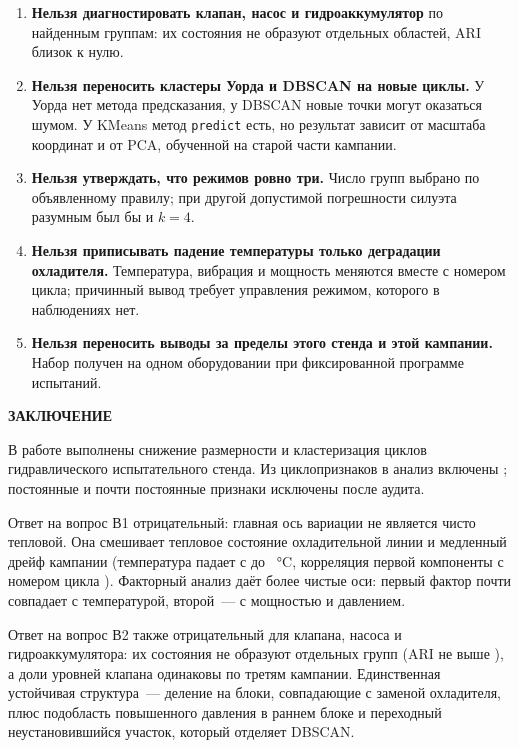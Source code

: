 \documentclass[14pt,a4paper]{extarticle}
\newcommand{\struct}[1]{%
  \clearpage
  \begin{center}\bfseries #1\end{center}%
  \addcontentsline{toc}{section}{#1}%
}
\begin{document}
\begin{enumerate}
\item \textbf{Нельзя диагностировать клапан, насос и гидроаккумулятор} по
  найденным группам: их состояния не образуют отдельных областей, ARI близок
  к нулю.
\item \textbf{Нельзя переносить кластеры Уорда и DBSCAN на новые циклы.} У
  Уорда нет метода предсказания, у DBSCAN новые точки могут оказаться шумом.
  У KMeans метод \texttt{predict} есть, но результат зависит от масштаба
  координат и от PCA, обученной на старой части кампании.
\item \textbf{Нельзя утверждать, что режимов ровно три.} Число групп выбрано
  по объявленному правилу; при другой допустимой погрешности силуэта
  разумным был бы и $k=4$.
\item \textbf{Нельзя приписывать падение температуры только деградации
  охладителя.} Температура, вибрация и мощность меняются вместе с номером
  цикла; причинный вывод требует управления режимом, которого в наблюдениях
  нет.
\item \textbf{Нельзя переносить выводы за пределы этого стенда и этой
  кампании.} Набор получен на одном оборудовании при фиксированной программе
  испытаний.
\end{enumerate}

\struct{ЗАКЛЮЧЕНИЕ}

\noindent
В работе выполнены снижение размерности и кластеризация \DataCycles{} циклов
гидравлического испытательного стенда. Из \DataFeaturesAll{} циклопризнаков в
анализ включены \DataFeaturesUsed{}; постоянные и почти постоянные признаки
исключены после аудита.

Ответ на вопрос В1 отрицательный: главная ось вариации не является чисто
тепловой. Она смешивает тепловое состояние охладительной линии и медленный
дрейф кампании (температура падает с \DriftTsOneEarly{} до \DriftTsOneLate~°C,
корреляция первой компоненты с номером цикла \DriftPcOneCorr). Факторный
анализ даёт более чистые оси: первый фактор почти совпадает с температурой,
второй~--- с мощностью и давлением.

Ответ на вопрос В2 также отрицательный для клапана, насоса и
гидроаккумулятора: их состояния не образуют отдельных групп (ARI не выше
\KmAriPump), а доли уровней клапана одинаковы по третям кампании. Единственная
устойчивая структура~--- деление на блоки, совпадающие с заменой охладителя,
плюс подобласть повышенного давления в раннем блоке и переходный
неустановившийся участок, который отделяет DBSCAN.
\end{document}
